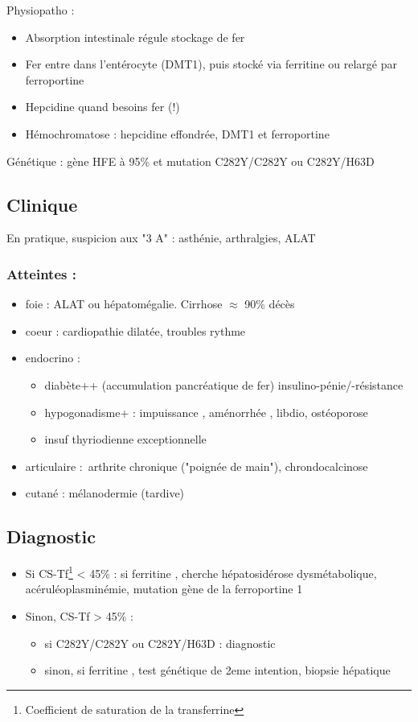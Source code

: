 \documentclass[11pt]{article}
\begin{document}
Physiopatho : 
\begin{itemize}
\item Absorption intestinale régule stockage de fer
\item Fer entre dans l'entérocyte (DMT1), puis stocké via ferritine ou relargé par ferroportine
\item Hepcidine \dec quand besoins fer \inc (!)
\item Hémochromatose : hepcidine effondrée, DMT1 et ferroportine \inc
\end{itemize}

Génétique : gène HFE à 95\% et mutation C282Y/C282Y ou C282Y/H63D

\subsection{Clinique}
\label{sec:orge720725}
En pratique, suspicion aux "3 A" : asthénie, arthralgies, \inc ALAT

\subsubsection{Atteintes :}
\label{sec:orge094897}
\begin{itemize}
\item foie : \inc ALAT ou hépatomégalie. Cirrhose \(\approx\) 90\% décès
\item coeur : cardiopathie dilatée, troubles rythme
\item endocrino :
\begin{itemize}
\item diabète++ (accumulation pancréatique de fer) insulino-pénie/-résistance
\item hypogonadisme+ : impuissance \male, aménorrhée \female, \dec libdio,
ostéoporose
\item insuf thyriodienne exceptionnelle
\end{itemize}
\item articulaire : arthrite chronique ("poignée de main"), chrondocalcinose
\item cutané : mélanodermie (tardive)
\end{itemize}


\subsection{Diagnostic}
\label{sec:org9626e29}
\begin{itemize}
\item Si CS-Tf\footnote{Coefficient de saturation de la transferrine} < 45\% : si ferritine \inc, cherche hépatosidérose dysmétabolique,
acéruléoplasminémie, mutation gène de la ferroportine 1
\item Sinon, CS-Tf > 45\% : 
\begin{itemize}
\item si C282Y/C282Y ou C282Y/H63D : diagnostic
\item sinon, si ferritine \inc, test génétique de 2eme intention, biopsie
hépatique
\end{itemize}
\end{itemize}
\end{document}
